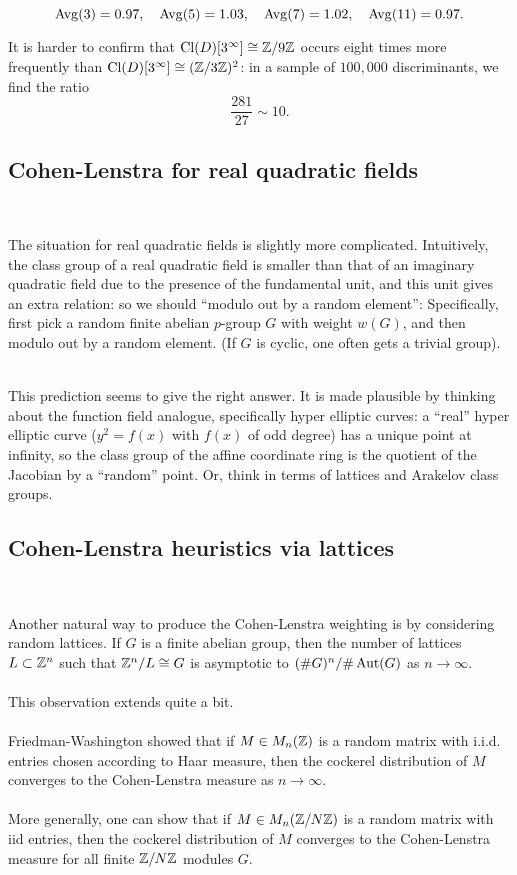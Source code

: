 \documentclass[12pt,amsfont]{amsart}
\begin{document}
$$
\operatorname{Avg}(3) = 0.97,\quad \operatorname{Avg}(5) = 1.03,\quad \operatorname{Avg}(7) = 1.02,\quad \operatorname{Avg}(11) = 0.97.$$ 

It is harder to confirm that $\operatorname{Cl}(D)[3^\infty] \cong {\mathbb Z}/9{\mathbb Z}$ occurs eight times more frequently than $\operatorname{Cl}(D)[3^\infty] \cong ({\mathbb Z}/3{\mathbb Z})^2$: in a sample of $100,000$ discriminants, we find the ratio 
\[
\frac{281}{27} \sim 10. 
\]

\subsection{Cohen-Lenstra for real quadratic fields}
{\ }

The situation for real quadratic fields is slightly more complicated. Intuitively, the class group of a real quadratic field is smaller than that of an imaginary quadratic field due to the presence of the fundamental unit, and this unit gives an extra relation: so we should ``modulo out by a random element'': Specifically, first pick a random finite abelian $p$-group $G$ with weight $w(G)$, and then modulo out by a random element. (If $G$ is cyclic, one often gets a trivial group). \\ \\
\begin{rmk}
This prediction seems to give the right answer. It is made plausible by thinking about the function field analogue, specifically hyper elliptic curves: a ``real'' hyper elliptic curve ($y^2 = f(x)$ with $f(x)$ of odd degree) has a unique point at infinity, so the class group of the affine coordinate ring is the quotient of the Jacobian by a ``random'' point. Or, think in terms of lattices and Arakelov class groups. 
\end{rmk}
\subsection{Cohen-Lenstra heuristics via lattices}
{\ }

Another natural way to produce the Cohen-Lenstra weighting is by considering random lattices. If $G$ is a finite abelian group, then the number of lattices $L \subset {\mathbb Z}^n$ such that ${\mathbb Z}^n/L \cong G$ is asymptotic to $(\# G)^n/\#\operatorname{Aut}(G)$ as $n \rightarrow \infty$. \\ \\
This observation extends quite a bit. \\ \\
Friedman-Washington showed that if $M \in M_n({\mathbb Z})$ is a random matrix with i.i.d. entries chosen according to Haar measure, then the cockerel distribution of $M$ converges to the Cohen-Lenstra measure as $n \rightarrow \infty$. \\ \\
More generally, one can show that if $M \in M_n({\mathbb Z}/N{\mathbb Z})$ is a random matrix with iid entries, then the cockerel distribution of $M$ converges to the Cohen-Lenstra measure for all finite ${\mathbb Z}/N{\mathbb Z}$ modules $G$. 
\end{document}
